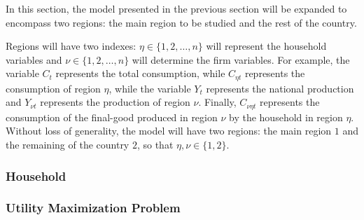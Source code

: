 \documentclass[
thesis.tex
]{subfiles}
\begin{document}
In this section, the model presented in the previous section will be expanded to encompass two regions: the main region to be studied and the rest of the country.

Regions will have two indexes: $\eta \in \{1,2,\ldots,n\}$ will represent the household variables and $\nu \in \{1,2,\ldots,n\}$ will determine the firm variables. For example, the variable $C_{t}$ represents the total consumption, while $C_{\eta t}$ represents the consumption of region $\eta$, while the variable $Y_t$ represents the national production and $Y_{\nu t}$ represents the production of region $\nu$. Finally, $C_{\nu\eta t}$ represents the consumption of the final-good produced in region $\nu$ by the household in region $\eta$. Without loss of generality, the model will have two regions: the main region $1$ and the remaining of the country $2$, so that $\eta,\nu \in \{1,2\}$.



\subsubsection{Household}

\subsubsection*{Utility Maximization Problem}
\end{document}

